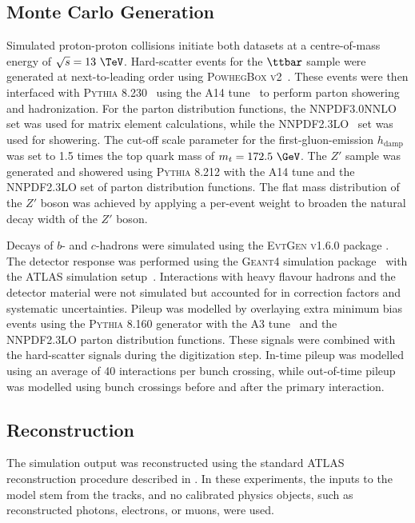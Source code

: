 \subsection{Monte Carlo Generation}

Simulated proton-proton collisions initiate both datasets at a centre-of-mass energy of $\sqrt{s} = 13~\TeV$.
Hard-scatter events for the $\ttbar$ sample were generated at next-to-leading order using \textsc{PowhegBox v2}~\cite{Powheg1, Powheg2, Powheg3}.
These events were then interfaced with \textsc{Pythia 8.230}~\cite{Pythia8} using the \textsc{A14} tune~\cite{A14} to perform parton showering and hadronization.
For the parton distribution functions, the \textsc{NNPDF3.0NNLO}~\cite{PDF3.0} set was used for matrix element calculations, while the \textsc{NNPDF2.3LO}~\cite{PDF2.3} set was used for showering.
The cut-off scale parameter for the first-gluon-emission $h_{\text{damp}}$ was set to 1.5 times the top quark mass of $m_t = 172.5~\GeV$.
The $Z'$ sample was generated and showered using \textsc{Pythia 8.212} with the \textsc{A14} tune and the \textsc{NNPDF2.3LO} set of parton distribution functions.
The flat mass distribution of the $Z'$ boson was achieved by applying a per-event weight to broaden the natural decay width of the $Z'$ boson.

Decays of $b$- and $c$-hadrons were simulated using the \textsc{EvtGen v1.6.0} package \cite{EvtGen}.
The detector response was performed using the \textsc{Geant4} simulation package~\cite{Geant4} with the ATLAS simulation setup~\cite{ATLASSim}.
Interactions with heavy flavour hadrons and the detector material were not simulated but accounted for in correction factors and systematic uncertainties.
Pileup was modelled by overlaying extra minimum bias events using the \textsc{Pythia 8.160} generator with the \textsc{A3} tune~\cite{A3} and the \textsc{NNPDF2.3LO} parton distribution functions.
These signals were combined with the hard-scatter signals during the digitization step.
In-time pileup was modelled using an average of 40 interactions per bunch crossing, while out-of-time pileup was modelled using bunch crossings before and after the primary interaction.

\subsection{Reconstruction}

The simulation output was reconstructed using the standard ATLAS reconstruction procedure described in .
In these experiments, the inputs to the model stem from the tracks, and no calibrated physics objects, such as reconstructed photons, electrons, or muons, were used.

